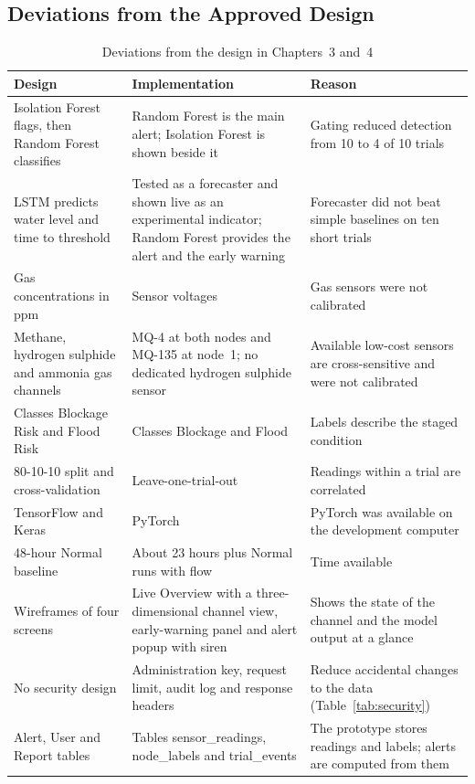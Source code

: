 \documentclass[12pt, a4paper]{article}
\begin{document}
\subsection{Deviations from the Approved Design}

\begin{table}[H]
\centering

\begin{tabular}{|p{4.2cm}|p{4.2cm}|p{5.4cm}|}
\hline
\textbf{Design} & \textbf{Implementation} & \textbf{Reason} \\
\hline
Isolation Forest flags, then Random Forest classifies & Random Forest is the main alert; Isolation Forest is shown beside it & Gating reduced detection from 10 to 4 of 10 trials \\
\hline
LSTM predicts water level and time to threshold & Tested as a forecaster and shown live as an experimental indicator; Random Forest provides the alert and the early warning & Forecaster did not beat simple baselines on ten short trials \\
\hline
Gas concentrations in ppm & Sensor voltages & Gas sensors were not calibrated \\
\hline
Methane, hydrogen sulphide and ammonia gas channels & MQ-4 at both nodes and MQ-135 at node~1; no dedicated hydrogen sulphide sensor & Available low-cost sensors are cross-sensitive and were not calibrated \\
\hline
Classes Blockage Risk and Flood Risk & Classes Blockage and Flood & Labels describe the staged condition \\
\hline
80-10-10 split and cross-validation & Leave-one-trial-out & Readings within a trial are correlated \\
\hline
TensorFlow and Keras & PyTorch & PyTorch was available on the development computer \\
\hline
48-hour Normal baseline & About 23 hours plus Normal runs with flow & Time available \\
\hline
Wireframes of four screens & Live Overview with a three-dimensional channel view, early-warning panel and alert popup with siren & Shows the state of the channel and the model output at a glance \\
\hline
No security design & Administration key, request limit, audit log and response headers & Reduce accidental changes to the data (Table~\ref{tab:security}) \\
\hline
Alert, User and Report tables & Tables sensor\_readings, node\_labels and trial\_events & The prototype stores readings and labels; alerts are computed from them \\
\hline
\end{tabular}
\caption{Deviations from the design in Chapters~3 and~4}
\label{tab:deviations}
\end{table}
\end{document}
